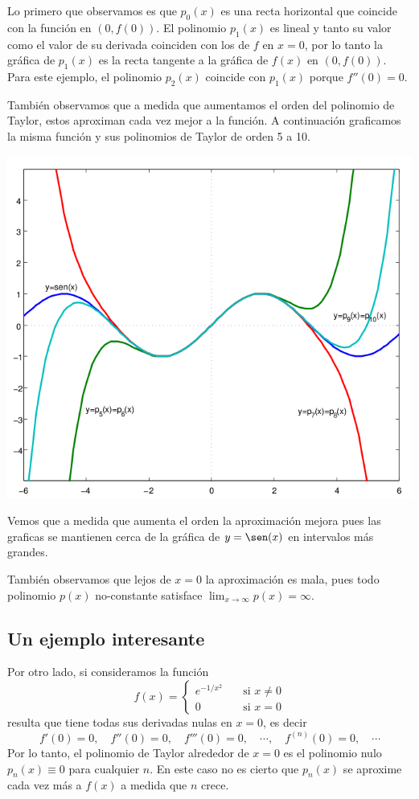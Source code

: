 Lo primero que observamos es que $p_0(x)$ es una recta horizontal que coincide con la función en $(0, f(0))$. El polinomio $p_1(x)$ es lineal y tanto su valor como el valor de su derivada coinciden con los de $f$ en $x=0$, por lo tanto la gráfica de $p_1(x)$ es la recta tangente a la gráfica de $f(x)$ en $(0,f(0))$. Para este ejemplo, el polinomio $p_2(x)$ coincide con $p_1(x)$ porque $f''(0) = 0$.

También observamos que a medida que aumentamos el orden del polinomio de Taylor, estos aproximan cada vez mejor a la función. A continuación graficamos la misma función y sus polinomios de Taylor de orden 5 a 10. 

\centerline{\includegraphics[width=.6\textwidth]{pics/taylor-seno-2.png}}

Vemos que a medida que aumenta el orden la aproximación mejora pues las graficas se mantienen cerca de la gráfica de $y=\sen(x)$ en intervalos más grandes.

También observamos que lejos de $x=0$ la aproximación es mala, pues todo polinomio $p(x)$ no-constante satisface $\lim_{x\to\infty} p(x) = \infty$.

\subsection{Un ejemplo interesante}
Por otro lado, si consideramos la función 
\[
 f(x) = \begin{cases}
         e^{-1/x^2} \quad &\text{si } x \neq 0 \\
         0          \quad &\text{si } x = 0 
        \end{cases}
\]
resulta que tiene todas sus derivadas nulas en $x = 0$, es decir
\[
 f'(0) = 0, \quad f''(0) = 0, \quad f'''(0) = 0,\quad  \cdots, \quad f^{(n)}(0) = 0, \quad \cdots
\]
Por lo tanto, el polinomio de Taylor alrededor de $x = 0$ es el polinomio nulo $p_n(x) \equiv 0$ para cualquier $n$.
En este caso no es cierto que $p_n(x)$ se aproxime cada vez más a $f(x)$ a medida que $n$ crece.

